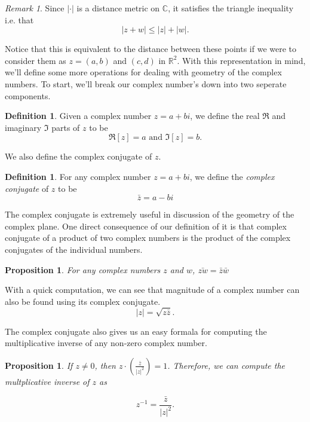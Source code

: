\documentclass[12pt]{article}
\newcommand{\bbR}{\mathbb{R}}
\newcommand{\bbC}{\mathbb{C}}
\newcommand{\abs}[1]{ \left| #1 \right| }
\newtheorem{prop}[thm]{Proposition}
\theoremstyle{definition}
\newtheorem{defn}[thm]{Definition}
\theoremstyle{remark}
\newtheorem{rem}[thm]{Remark}
\numberwithin{equation}{section}
\begin{document}
\begin{rem}
  Since $\abs{\cdot}$ is a distance metric on $\bbC$, it satisfies the triangle inequality i.e. that
  \begin{equation}
    \abs{z+w}\leq \abs{z} + \abs{w}.
  \end{equation}
\end{rem}

Notice that this is equivalent to the distance between these points if we were to consider them as $z=(a,b)$ and $(c,d)$ in $\bbR^2$. With this representation in mind, we'll define some more operations for dealing with geometry of the complex numbers. To start, we'll break our complex number's down into two seperate components.

\begin{defn}
Given a complex number $z = a + bi$, we define the real $\Re$ and imaginary $\Im$ parts of $z$ to be
\begin{equation}
  \Re[z] = a \text{ and  } \Im[z] = b.
\end{equation}
\end{defn}

We also define the complex conjugate of $z$.
\begin{defn}
For any complex number $z = a + bi$, we define the \emph{complex conjugate} of $z$ to be 
\begin{equation}
  \bar{z} = a - bi
\end{equation}
\end{defn}

The complex conjugate is extremely useful in discussion of the geometry of the complex plane. One direct consequence of our definition of it is that complex conjugate of a product of two complex numbers is the product of the complex conjugates of the individual numbers.

\begin{prop}
  For any complex numbers $z$ and $w$, $\bar{zw} = \bar{z}\bar{w}$
\end{prop}

With a quick computation, we can see that magnitude of a complex number can also be found using its complex conjugate.
\begin{equation}
  \abs{z} = \sqrt{z\bar{z}}. 
\end{equation}

The complex conjugate also gives us an easy formala for computing the multiplicative inverse of any non-zero complex number.

\begin{prop}
  If $z\neq 0$, then $z\cdot \left(\frac{\bar{z}}{\left|z\right|^2}\right)=1$. Therefore, we can compute the multplicative inverse of $z$ as

  \begin{equation}
    z^{-1}  = \frac{\bar{z}}{\left|z\right|^2}. 
  \end{equation}
\end{prop}
\end{document}

